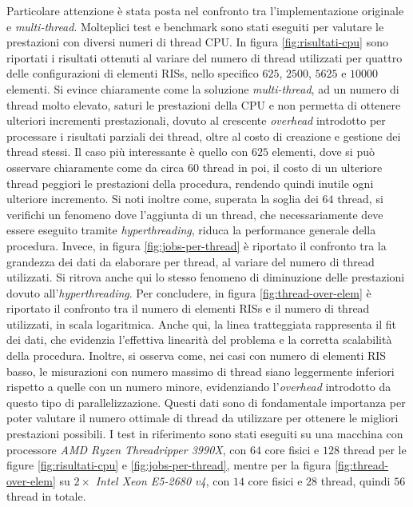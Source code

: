Particolare attenzione è stata posta nel confronto tra l'implementazione
originale e \textit{multi-thread}. Molteplici test e benchmark sono stati
eseguiti per valutare le prestazioni con diversi numeri di thread CPU. In figura
\ref{fig:risultati-cpu} sono riportati i risultati ottenuti al variare del numero
di thread utilizzati per quattro delle configurazioni di elementi RISs, nello
specifico $625$, $2500$, $5625$ e $10000$ elementi. Si evince chiaramente come la
soluzione \textit{multi-thread}, ad un numero di thread molto elevato, saturi le
prestazioni della CPU e non permetta di ottenere ulteriori incrementi
prestazionali, dovuto al crescente \textit{overhead} introdotto per processare i
risultati parziali dei thread, oltre al costo di creazione e gestione dei thread
stessi. Il caso più interessante è quello con $62 5$ elementi, dove si può osservare
chiaramente come da circa $60$ thread in poi, il costo di un ulteriore thread
peggiori le prestazioni della procedura, rendendo quindi inutile ogni ulteriore incremento.
Si noti inoltre come, superata la soglia dei $64$ thread, si verifichi un
fenomeno dove l'aggiunta di un thread, che necessariamente deve essere eseguito tramite
\textit{hyperthreading}, riduca la performance generale della procedura. Invece,
in figura \ref{fig:jobs-per-thread} è riportato il confronto tra la grandezza dei
dati da elaborare per thread, al variare del numero di thread utilizzati. Si ritrova
anche qui lo stesso fenomeno di diminuzione delle prestazioni dovuto all'\textit{hyperthreading}.
Per concludere, in figura \ref{fig:thread-over-elem} è riportato il confronto
tra il numero di elementi RISs e il numero di thread utilizzati, in scala logaritmica.
Anche qui, la linea tratteggiata rappresenta il fit dei dati, che evidenzia l'effettiva
linearità del problema e la corretta scalabilità della procedura. Inoltre, si
osserva come, nei casi con numero di elementi RIS basso, le misurazioni con
numero massimo di thread siano leggermente inferiori rispetto a quelle con un
numero minore, evidenziando l'\textit{overhead} introdotto da questo tipo di
parallelizzazione. Questi dati sono di fondamentale importanza per poter valutare
il numero ottimale di thread da utilizzare per ottenere le migliori prestazioni possibili.
I test in riferimento sono stati eseguiti su una macchina con processore \textit{AMD
Ryzen Threadripper 3990X}, con $64$ core fisici e $128$ thread per le figure
\ref{fig:risultati-cpu} e \ref{fig:jobs-per-thread}, mentre per la figura \ref{fig:thread-over-elem}
su $2\times$ \textit{Intel Xeon E5-2680 v4}, con $14$ core fisici e $28$ thread,
quindi $5 6$ thread in totale.

